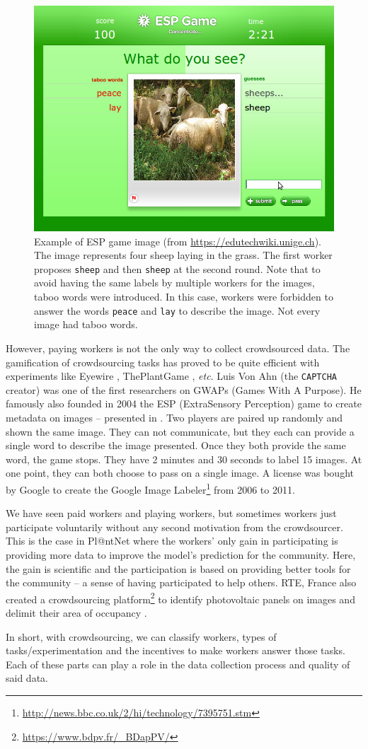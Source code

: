 \begin{figure}[ht]
        \centering
        \includegraphics[width=.6\textwidth]{chapters/images/ESP.png}
        \caption{Example of ESP game image (from \url{https://edutechwiki.unige.ch}). The image represents four sheep laying in the grass. The first worker proposes \texttt{sheep} and then \texttt{sheep} at the second round. Note that to avoid having the same labels by multiple workers for the images, taboo words were introduced. In this case, workers were forbidden to answer the words \texttt{peace} and \texttt{lay} to describe the image. Not every image had taboo words.}
        \label{fig:ESP-game}
\end{figure}

However, paying workers is not the only way to collect crowdsourced data.
The gamification of crowdsourcing tasks has proved to be quite efficient with experiments like Eyewire \citep{tinati2017investigation}, ThePlantGame \citep{plantgame2016}, \emph{etc}.
Luis Von Ahn (the \texttt{CAPTCHA} creator) was one of the first researchers on GWAPs (Games With A Purpose).
He famously also founded in 2004 the ESP (ExtraSensory Perception) game \citep{von2005esp} to create metadata on images --  presented in .
Two players are paired up randomly and shown the same image.
They can not communicate, but they each can provide a single word to describe the image presented.
Once they both provide the same word, the game stops.
They have 2 minutes and 30 seconds to label 15 images.
At one point, they can both choose to pass on a single image.
A license was bought by Google to create the Google Image Labeler\footnote{\url{http://news.bbc.co.uk/2/hi/technology/7395751.stm}} from 2006 to 2011.

We have seen paid workers and playing workers, but sometimes workers just participate voluntarily without any second motivation from the crowdsourcer.
This is the case in Pl@ntNet where the workers' only gain in participating is providing more data to improve the model's prediction for the community. Here, the gain is scientific and the participation is based on providing better tools for the community -- a sense of having participated to help others.
RTE, France also created a crowdsourcing platform\footnote{\url{https://www.bdpv.fr/_BDapPV/}} to identify photovoltaic panels on images and delimit their area of occupancy \citep{kasmi2023crowdsourced}.

In short, with crowdsourcing, we can classify workers, types of tasks/experimentation and the incentives to make workers answer those tasks. Each of these parts can play a role in the data collection process and quality of said data.
